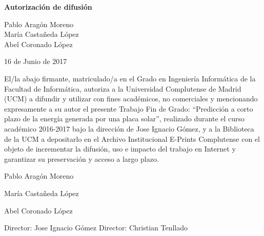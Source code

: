 
\newpage

\thispagestyle{empty}

\begin{center}

{\bf \Huge Autorización de difusión}

\vspace{1cm}

    {\large Pablo Aragón Moreno}\\
    {\large María Castañeda López}\\
    {\large Abel Coronado López}\\

   \vspace{0.5cm}

   16 de Junio de 2017\\
   \vspace{0.5cm}

\end{center}
   
El/la abajo firmante, matriculado/a en el Grado en Ingeniería Informática de la Facultad de Informática, autoriza a la Universidad Complutense de Madrid (UCM) a difundir y utilizar con fines académicos, no comerciales y mencionando expresamente a su autor el presente Trabajo Fin de Grado: “Predicción a corto plazo de la energía
    generada por una placa solar”, realizado durante el curso académico 2016-2017 bajo la dirección de Jose Ignacio Gómez, y a la Biblioteca de la UCM a depositarlo en el Archivo Institucional E-Prints Complutense con el objeto de incrementar la difusión, uso e impacto del trabajo en Internet y garantizar su preservación y acceso a largo plazo.

\vspace{2cm}

{\large Pablo Aragón Moreno}

\vspace{2.5cm}

{\large María Castañeda López}

\vspace{2.5cm}

{\large Abel Coronado López}

\vspace{2.5cm}

{\large Director: Jose Ignacio Gómez} \hspace{2cm} {\large Director: Christian Tenllado}
